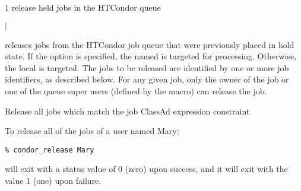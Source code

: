 \begin{ManPage}{\label{man-condor-release}}{1}
{release held jobs in the HTCondor queue}

\Synopsis {}
\ToolArgsBase 

\ToolDebugOption
\ToolLocate
\ToolJobs
$|$  \Dots

\ToolDebugOption
\ToolLocate
\ToolAll

\Description

 releases jobs from the HTCondor job queue that were 
previously placed in hold state.  
If the  option is specified, the named  is targeted
for processing.  
Otherwise, the local  is targeted.
The jobs to be released are identified by one or more job identifiers, as
described below.
For any given job, only the owner of the job or one of the queue super users
(defined by the  macro) can release the job.

\begin{Options}
	\ToolArgsBaseDesc
	\ToolLocateDesc
	\ToolDebugDesc
	 {Release all jobs which match
	                the job ClassAd expression constraint}
\end{Options}

\SeeAlso
{}


\Examples
To release all of the jobs of a user named Mary:
\footnotesize
\begin{verbatim}
% condor_release Mary 
\end{verbatim}
\normalsize

\ExitStatus

 will exit with a status value of 0 (zero) upon success,
and it will exit with the value 1 (one) upon failure.

\end{ManPage}
